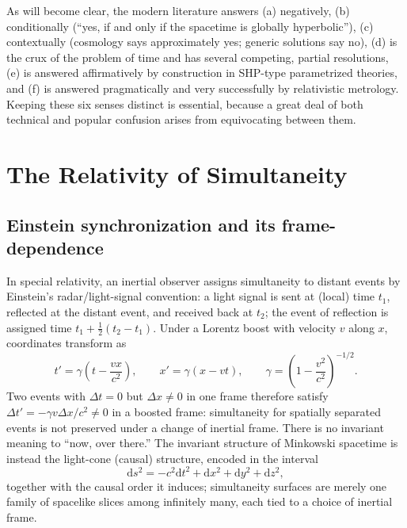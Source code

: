 \documentclass[11pt]{article}
\newcommand{\dd}{\mathrm{d}}
\begin{document}
As will become clear, the modern literature answers (a) negatively, (b) conditionally (``yes, if and only if the spacetime is globally hyperbolic''), (c) contextually (cosmology says approximately yes; generic solutions say no), (d) is the crux of the problem of time and has several competing, partial resolutions, (e) is answered affirmatively by construction in SHP-type parametrized theories, and (f) is answered pragmatically and very successfully by relativistic metrology. Keeping these six senses distinct is essential, because a great deal of both technical and popular confusion arises from equivocating between them.

\section{The Relativity of Simultaneity}
\label{sec:sr}

\subsection{Einstein synchronization and its frame-dependence}

In special relativity, an inertial observer assigns simultaneity to distant events by Einstein's radar/light-signal convention: a light signal is sent at (local) time $t_1$, reflected at the distant event, and received back at $t_2$; the event of reflection is assigned time $t_1+\tfrac12(t_2-t_1)$. Under a Lorentz boost with velocity $v$ along $x$, coordinates transform as
\begin{equation}
t' = \gamma\left(t - \frac{v x}{c^2}\right), \qquad x' = \gamma\left(x - v t\right), \qquad \gamma = \left(1-\frac{v^2}{c^2}\right)^{-1/2}.
\end{equation}
Two events with $\Delta t = 0$ but $\Delta x \neq 0$ in one frame therefore satisfy $\Delta t' = -\gamma v \Delta x/c^2 \neq 0$ in a boosted frame: simultaneity for spatially separated events is not preserved under a change of inertial frame. There is no invariant meaning to ``now, over there.'' The invariant structure of Minkowski spacetime is instead the light-cone (causal) structure, encoded in the interval
\begin{equation}
\dd s^2 = -c^2\dd t^2 + \dd x^2+\dd y^2+\dd z^2,
\end{equation}
together with the causal order it induces; simultaneity surfaces are merely one family of spacelike slices among infinitely many, each tied to a choice of inertial frame.
\end{document}
